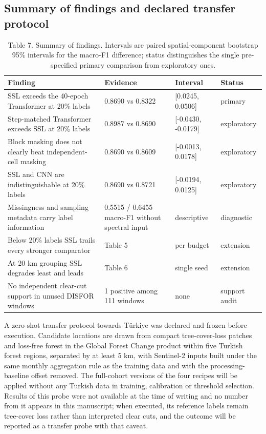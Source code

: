 \documentclass[11pt,a4paper]{article}
\begin{document}
\subsection{Summary of findings and declared transfer protocol}
\begin{table}[htbp]
\centering
\small
\caption{Table 7. Summary of findings. Intervals are paired spatial-component bootstrap 95\% intervals for the macro-F1 difference; status distinguishes the single pre-specified primary comparison from exploratory ones.}
\begin{tabular}{p{5.6cm}p{4.2cm}p{2.8cm}p{2.0cm}}
\toprule
Finding & Evidence & Interval & Status \\ \midrule
SSL exceeds the 40-epoch Transformer at 20\% labels & 0.8690 vs 0.8322 & [0.0245, 0.0506] & primary \\
Step-matched Transformer exceeds SSL at 20\% labels & 0.8987 vs 0.8690 & [-0.0430, -0.0179] & exploratory \\
Block masking does not clearly beat independent-cell masking & 0.8690 vs 0.8609 & [-0.0013, 0.0178] & exploratory \\
SSL and CNN are indistinguishable at 20\% labels & 0.8690 vs 0.8721 & [-0.0194, 0.0125] & exploratory \\
Missingness and sampling metadata carry label information & 0.5515 / 0.6455 macro-F1 without spectral input & descriptive & diagnostic \\
Below 20\% labels SSL trails every stronger comparator & Table 5 & per budget & extension \\
At 20 km grouping SSL degrades least and leads & Table 6 & single seed & extension \\
No independent clear-cut support in unused DISFOR windows & 1 positive among 111 windows & none & support audit \\
\bottomrule
\end{tabular}
\end{table}

A zero-shot transfer protocol towards Türkiye was declared and frozen before execution. Candidate locations are drawn from compact tree-cover-loss patches and loss-free forest in the Global Forest Change product \cite{ref17} within five Turkish forest regions, separated by at least 5 km, with Sentinel-2 inputs built under the same monthly aggregation rule as the training data and with the processing-baseline offset removed. The full-cohort versions of the four recipes will be applied without any Turkish data in training, calibration or threshold selection. Results of this probe were not available at the time of writing and no number from it appears in this manuscript; when executed, its reference labels remain tree-cover loss rather than interpreted clear cuts, and the outcome will be reported as a transfer probe with that caveat.
\end{document}

